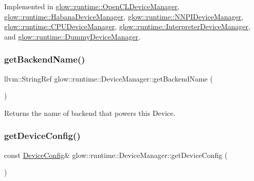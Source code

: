 Implemented in \hyperlink{classglow_1_1runtime_1_1_open_c_l_device_manager_a8ed9fd00ebbed793fd430f9dd227a2cd}{glow\+::runtime\+::\+Open\+C\+L\+Device\+Manager}, \hyperlink{classglow_1_1runtime_1_1_habana_device_manager_a9b23cdaa74210f057dd3bb6f839e0509}{glow\+::runtime\+::\+Habana\+Device\+Manager}, \hyperlink{classglow_1_1runtime_1_1_n_n_p_i_device_manager_ab494e0ba08e0859f436ef591c15f7fd5}{glow\+::runtime\+::\+N\+N\+P\+I\+Device\+Manager}, \hyperlink{classglow_1_1runtime_1_1_c_p_u_device_manager_a652125a46bce98a6b08cfb9907b03b26}{glow\+::runtime\+::\+C\+P\+U\+Device\+Manager}, \hyperlink{classglow_1_1runtime_1_1_interpreter_device_manager_aad7c95da9a3fe8627093a3ba8ad224d4}{glow\+::runtime\+::\+Interpreter\+Device\+Manager}, and \hyperlink{classglow_1_1runtime_1_1_dummy_device_manager_a96ef72c763a1932e1482c29b4eea486b}{glow\+::runtime\+::\+Dummy\+Device\+Manager}.

\mbox{\label{classglow_1_1runtime_1_1_device_manager_aa86bf2fba88df94818b1bb5cec5dd2d7}} 
\subsubsection{\texorpdfstring{get\+Backend\+Name()}{getBackendName()}}
{\footnotesize\ttfamily llvm\+::\+String\+Ref glow\+::runtime\+::\+Device\+Manager\+::get\+Backend\+Name (\begin{DoxyParamCaption}{ }\end{DoxyParamCaption})\hspace{0.3cm}{\ttfamily [inline]}}

\begin{DoxyReturn}{Returns}
the name of backend that powers this Device. 
\end{DoxyReturn}
\mbox{\label{classglow_1_1runtime_1_1_device_manager_a70a7ee3ea3c0b27c0d0d934e45b99ca3}} 
\subsubsection{\texorpdfstring{get\+Device\+Config()}{getDeviceConfig()}}
{\footnotesize\ttfamily const \hyperlink{structglow_1_1runtime_1_1_device_config}{Device\+Config}\& glow\+::runtime\+::\+Device\+Manager\+::get\+Device\+Config (\begin{DoxyParamCaption}{ }\end{DoxyParamCaption})\hspace{0.3cm}{\ttfamily [inline]}}

